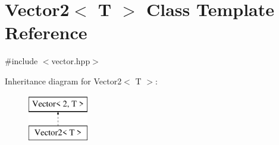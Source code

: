 \hypertarget{class_vector2}{}\section{Vector2$<$ T $>$ Class Template Reference}
\label{class_vector2}


{\ttfamily \#include $<$vector.\+hpp$>$}

Inheritance diagram for Vector2$<$ T $>$\+:\begin{figure}[H]
\begin{center}
\leavevmode
\includegraphics[height=2.000000cm]{class_vector2}
\end{center}
\end{figure}
